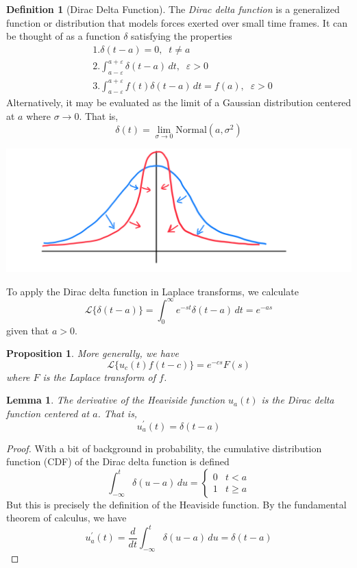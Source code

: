 \documentclass{article}
\newtheorem{proposition}[theorem]{Proposition}
\newtheorem{lemma}[theorem]{Lemma}
\theoremstyle{remark}
\theoremstyle{definition}
\newtheorem{definition}{Definition}[section]
\begin{document}
    \begin{definition}[Dirac Delta Function]
    The \textit{Dirac delta function} is a generalized function or distribution that models forces exerted over small time frames. It can be thought of as a function $\delta$ satisfying the properties 
    \begin{align*}
        & 1. \delta (t - a) = 0, \;\; t \neq a \\
        & 2. \int_{a-\varepsilon}^{a+\varepsilon} \delta(t-a) \,dt, \;\; \varepsilon > 0 \\
        & 3. \int_{a-\varepsilon}^{a+\varepsilon} f(t) \delta(t-a) \,dt = f(a), \;\; \varepsilon > 0
    \end{align*}
    Alternatively, it may be evaluated as the limit of a Gaussian distribution centered at $a$ where $\sigma \rightarrow 0$. That is, 
    \[\delta(t) = \lim_{\sigma \rightarrow 0} \text{Normal}(a, \sigma^2)\]
    \begin{center}
        \includegraphics[scale=0.23]{img/Dirac_Delta.PNG}
    \end{center}
    \end{definition}

    To apply the Dirac delta function in Laplace transforms, we calculate
    \[\mathcal{L} \{ \delta(t-a)\} = \int_0^\infty e^{-st} \delta(t-a) \,dt = e^{-as}\]
    given that $a>0$. 

    \begin{proposition}
    More generally, we have
    \[\mathcal{L}\{u_c (t) f(t-c)\} = e^{-cs} F(s)\]
    where $F$ is the Laplace transform of $f$. 
    \end{proposition}

    \begin{lemma}
    The derivative of the Heaviside function $u_a (t)$ is the Dirac delta function centered at $a$. That is, 
    \[u_a^\prime (t) = \delta (t - a)\]
    \end{lemma}
    \begin{proof}
    With a bit of background in probability, the cumulative distribution function (CDF) of the Dirac delta function is defined
    \[\int_{-\infty}^t \delta(u - a)\,du = \begin{cases}
    0 & t < a \\
    1 & t \geq a
    \end{cases}\]
    But this is precisely the definition of the Heaviside function. By the fundamental theorem of calculus, we have
    \[u^\prime_a (t) = \frac{d}{d t} \int_{-\infty}^t \delta(u-a)\, du = \delta(t-a)\]
    \end{proof}
\end{document}
